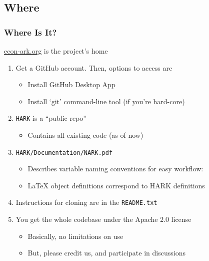 \documentclass[public]{beamer}
\providecommand{\ARK}{\href{http://econ-ark.org}{econ-ark.org}}
\begin{document}
\subsection{Where}
\begin{frame}
\frametitle{Where Is It?}

\begin{center}
{\ARK} is the project's home
\end{center}

\begin{enumerate}
\item Get a GitHub account.  Then, options to access are
\begin{itemize}
\item Install GitHub Desktop App
\item Install `git' command-line tool (if you're hard-core)
\end{itemize}
\item \texttt{HARK} is a ``public repo'' 
\begin{itemize}
\item Contains all existing code (as of now)
\end{itemize}
\item \texttt{HARK/Documentation/NARK.pdf}
\begin{itemize}
\item Describes variable naming conventions for easy workflow: 
\item {\LaTeX} object definitions correspond to HARK definitions 
\end{itemize}
\item Instructions for cloning are in the \texttt{README.txt}
\item You get the whole codebase under the Apache 2.0 license 
\begin{itemize}
\item Basically, no limitations on use
\item But, please credit us, and participate in discussions
\end{itemize}
\end{enumerate}

\end{frame}
\end{document}
